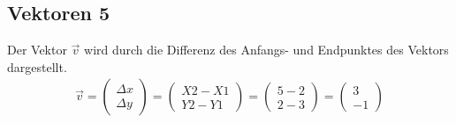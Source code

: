 \documentclass{article}
\newcommand{\m}[1]{\begin{pmatrix}#1\end{pmatrix}}
\begin{document}
    \newpage


    \subsection{Vektoren 5}
    \begin{figure}[h]
        \centering
    \end{figure}
    Der Vektor $\vec{v}$ wird durch die Differenz des Anfangs- und Endpunktes des Vektors dargestellt.
    \[
        \begin{split}
            \vec{v} = \m{\Delta{x} \\ \Delta{y}} = \m{X2 - X1 \\ Y2 - Y1} = \m{5 - 2 \\ 2 - 3} = \m{3 \\ -1}
        \end{split}  
    \]
\end{document}
